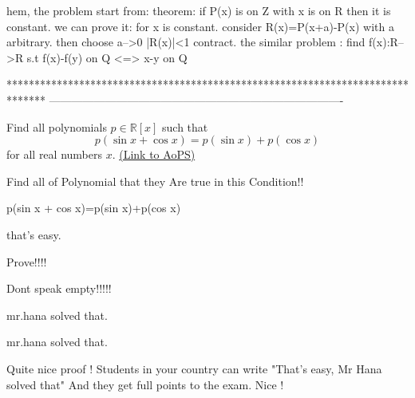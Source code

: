 \begin{solution}
	hem, the problem start from: theorem: if P(x) is on Z with x is on R then it is constant. we can prove it: for x is constant. consider R(x)=P(x+a)-P(x) with a arbitrary. then choose a-->0 |R(x)|<1 contract. the similar problem : find f(x):R-->R s.t f(x)-f(y) on Q <=> x-y on Q
\end{solution}
*******************************************************************************
-------------------------------------------------------------------------------

\begin{problem}
	Find all polynomials $p \in \mathbb R[x]$ such that
\[p(\sin x + \cos x)=p(\sin x)+p(\cos x)\]
for all real numbers $x$.
	\flushright \href{https://artofproblemsolving.com/community/c6h392244}{(Link to AoPS)}
\end{problem}



\begin{solution}
	\begin{tcolorbox}Find all of Polynomial that they Are true in this Condition!!

p(sin x + cos x)=p(sin x)+p(cos x)\end{tcolorbox}

that's easy.
\end{solution}



\begin{solution}
	Prove!!!!

Dont speak empty!!!!!
\end{solution}



\begin{solution}
	mr.hana solved that.
\end{solution}



\begin{solution}
	\begin{tcolorbox}mr.hana solved that.\end{tcolorbox}
Quite nice proof !
Students in your country can write "That's easy, Mr Hana solved that" And they get full points to the exam.
Nice !
\end{solution}



